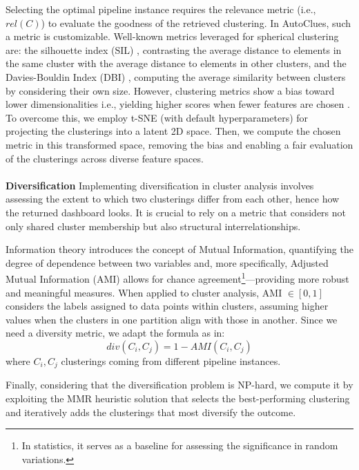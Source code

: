 \documentclass[runningheads]{llncs}
\begin{document}
Selecting the optimal pipeline instance requires the relevance metric (i.e., $rel(C)$) to evaluate the goodness of the retrieved clustering.
In AutoClues, such a metric is customizable.
Well-known metrics leveraged for spherical clustering are: the silhouette index (SIL) \cite{zhu2010clustering}, contrasting the average distance to elements in the same cluster with the average distance to elements in other clusters, and the Davies-Bouldin Index (DBI) \cite{dbi}, computing the average similarity between clusters by considering their own size.
However, clustering metrics show a bias toward lower dimensionalities i.e., yielding higher scores when fewer features are chosen \cite{lensen2017using,hancer2020new}. 
To overcome this, we employ t-SNE \cite{van2008visualizing} (with default hyperparameters) for projecting the clusterings into a latent 2D space. 
Then, we compute the chosen metric in this transformed space, removing the bias and enabling a fair evaluation of the clusterings across diverse feature spaces.
%
\\
\\
\textbf{Diversification}
Implementing diversification in cluster analysis involves assessing the extent to which two clusterings differ from each other, hence how the returned dashboard looks.
It is crucial to rely on a metric that considers not only shared cluster membership but also structural interrelationships.

Information theory introduces the concept of Mutual Information, quantifying the degree of dependence between two variables and, more specifically, Adjusted Mutual Information (AMI) allows for chance agreement\footnote{In statistics, it serves as a baseline for assessing the significance in random variations.}---providing more robust and meaningful measures.
When applied to cluster analysis, AMI $\in [0, 1]$ considers the labels assigned to data points within clusters, assuming higher values when the clusters in one partition align with those in another.
Since we need a diversity metric, we adapt the formula as in:
$$div(C_i, C_j) = 1- AMI(C_i, C_j)$$ 
where $C_i, C_j$ clusterings coming from different pipeline instances.

Finally, considering that the diversification problem is NP-hard, we compute it by exploiting the MMR heuristic solution \cite{vieira2011query} that selects the best-performing clustering and iteratively adds the clusterings that most diversify the outcome.
\end{document}
